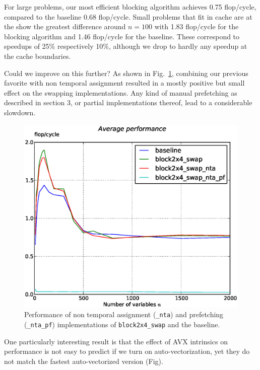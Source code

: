 \documentclass[letterpaper]{article}
\begin{document}
For large problems, our most efficient blocking algorithm achieves 0.75 flop/cycle, compared to the baseline 0.68 flop/cycle.
Small problems that fit in cache are at the show the greatest difference around $n=100$ with 1.83 flop/cycle for the blocking algorithm and 1.46 flop/cycle for the baseline.
These correspond to speedups of 25\% respectively 10\%, although we drop to hardly any speedup at the cache boundaries.

Could we improve on this further?
As shown in Fig.~\ref{fig:res_cachecontrol}, combining our previous favorite with non temporal assignment resulted in a mostly positive but small effect on the swapping implementations.
Any kind of manual prefetching as described in section 3, or partial implementations thereof, lead to a considerable slowdown.

\begin{figure}\centering
  \includegraphics[scale=0.4]{img/results_cachecontrol_novec.eps}
  \caption{Performance of non temporal assignment ({\tt \_nta}) and prefetching ({\tt \_nta\_pf}) implementations of {\tt block2x4\_swap} and the baseline.\label{fig:res_cachecontrol}}
\end{figure}

One particularly interesting result is that the effect of AVX intrinsics on performance is not easy to predict if we turn on auto-vectorization,
yet they do not match the fastest auto-vectorized version (Fig).
\end{document}
